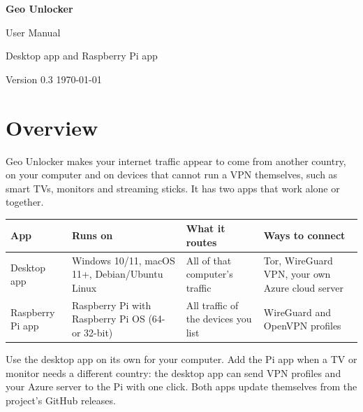 \documentclass[11pt,a4paper]{article}
\begin{document}
\begin{titlepage}
  \centering
  \vspace*{5cm}
  {\Huge\bfseries\color{accent} Geo Unlocker\par}
  \vspace{0.6cm}
  {\LARGE User Manual\par}
  \vspace{0.4cm}
  {\large Desktop app and Raspberry Pi app\par}
  \vfill
  {\color{muted} Version 0.3 \quad\textbullet\quad \today\par}
\end{titlepage}

\tableofcontents
\newpage

\section{Overview}

Geo Unlocker makes your internet traffic appear to come from another country, on your computer and on devices that cannot run a VPN themselves, such as smart TVs, monitors and streaming sticks. It has two apps that work alone or together.

\begin{center}
\begin{tabularx}{\linewidth}{@{}l L L L@{}}
\toprule
\textbf{App} & \textbf{Runs on} & \textbf{What it routes} & \textbf{Ways to connect} \\
\midrule
Desktop app & Windows 10/11, macOS 11+, Debian/Ubuntu Linux & All of that computer's traffic & Tor, WireGuard VPN, your own Azure cloud server \\
Raspberry Pi app & Raspberry Pi with Raspberry Pi OS (64- or 32-bit) & All traffic of the devices you list & WireGuard and OpenVPN profiles \\
\bottomrule
\end{tabularx}
\end{center}

Use the desktop app on its own for your computer. Add the Pi app when a TV or monitor needs a different country: the desktop app can send VPN profiles and your Azure server to the Pi with one click. Both apps update themselves from the project's GitHub releases.

\end{document}
